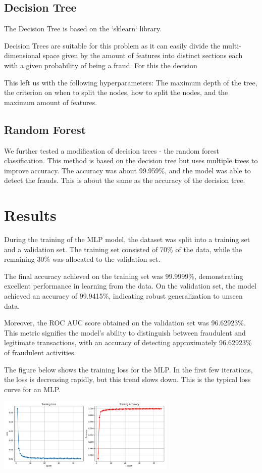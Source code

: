 \documentclass[a4paper, 10pt, conference]{ieeeconf}      %
\begin{document}
\subsection{Decision Tree}

The Decision Tree is based on the `sklearn` library. 

Decision Trees are suitable for this problem as it can easily divide the multi-dimensional space given by the amount of features into distinct sections each with a given probability of being a fraud. For this the decision 


This left us with the following hyperparameters: The maximum depth of the tree, the criterion on when to split the nodes, how to split the nodes, and the maximum amount of features. 



\subsection{Random Forest}

We further tested a modification of decision trees - the random forest classification. This method is based on the decision tree but uses multiple trees to improve accuracy. 
The accuracy was about 99.959\%, and the model was able to detect the frauds. This is about the same as the accuracy of the decision tree.

\section{Results}
\label{sec:results}
During the training of the MLP model, the dataset was split into a training set and a validation set. The training set consisted of 70\% of the data, while the remaining 30\% was allocated to the validation set.

The final accuracy achieved on the training set was 99.9999\%, demonstrating excellent performance in learning from the data. On the validation set, the model achieved an accuracy of 99.9415\%, indicating robust generalization to unseen data.

Moreover, the ROC AUC score obtained on the validation set was 96.62923\%. This metric signifies the model's ability to distinguish between fraudulent and legitimate transactions, with an accuracy of detecting approximately 96.62923\% of fraudulent activities.

The figure below shows the training loss for the MLP. In the first few iterations, the loss is decreasing rapidly, but this trend slows down. This is the typical loss curve for an MLP. 
\begin{center}
  \includegraphics[width=8.5cm]{../data/mlp-plot.png} \label{mlp-plot}
\end{center}
\end{document}
